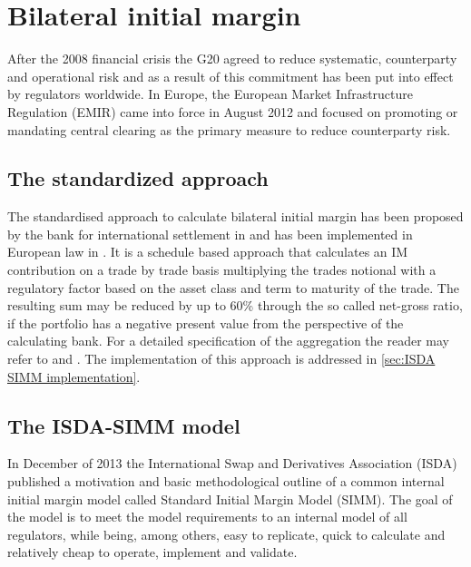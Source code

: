 \documentclass[../Thesis_AHoecherl.tex]{subfiles}
\begin{document}
    \section{Bilateral initial margin}\label{Bilateral initial margin}
    
    After the 2008 financial crisis the G20 agreed to reduce systematic, counterparty and operational risk and as a result of this commitment has been put into effect by regulators worldwide. In Europe, the European Market Infrastructure Regulation (EMIR) came into force in August 2012 and focused on promoting or mandating central clearing as the primary measure to reduce counterparty risk.

    \subsection{The standardized approach}\label{The standard approach}

    The standardised approach to calculate bilateral initial margin has been proposed by the bank for international settlement in \cite[Requirement 3.5 and 3.6]{BCBS_MarginRequirements} and has been implemented in European law in \cite{OTC_Margin_EU_Regulation}. It is a schedule based approach that calculates an \gls{IM} contribution on a trade by trade basis multiplying the trades notional with a regulatory factor based on the asset class and term to maturity of the trade.
    The resulting sum may be reduced by up to 60\% through the so called net-gross ratio, if the portfolio has a negative present value from the perspective of the calculating bank.
    For a detailed specification of the aggregation the reader may refer to \cite{BCBS_MarginRequirements} and \cite{OTC_Margin_EU_Regulation}. The implementation of this approach is addressed in \ref{sec:ISDA SIMM implementation}.
    
    \subsection{The ISDA-SIMM model}\label{sec:The ISDA-SIMM model}
    In December of 2013 the International Swap and Derivatives Association (ISDA) published a motivation and basic methodological outline of a common internal initial margin model called Standard Initial Margin Model (SIMM\texttrademark)\cite{ISDADec2013}. The goal of the model is to meet the model requirements to an internal model of all regulators, while being, among others, easy to replicate, quick to calculate and relatively cheap to operate, implement and validate.
\end{document}
